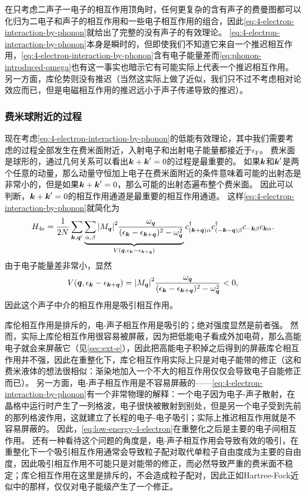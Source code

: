 在只考虑二声子一电子的相互作用顶角时，任何更复杂的含有声子的费曼图都可以化归为二电子和声子的相互作用和一些电子相互作用的组合，因此\eqref{eq:4-electron-interaction-by-phonon}就给出了完整的没有声子的有效理论。
\eqref{eq:4-electron-interaction-by-phonon}本身是瞬时的，但即使我们不知道它来自一个推迟相互作用，\eqref{eq:4-electron-interaction-by-phonon}含有电子能量差而\eqref{eq:phonon-introduced-omega}也有这一事实也暗示它有可能实际上代表一个推迟相互作用。
另一方面，库伦势则没有推迟（当然这实际上做了近似，我们只不过不考虑相对论效应而已，但是电磁相互作用的推迟远小于声子传递导致的推迟）。

\subsubsection{费米球附近的过程}

现在考虑\eqref{eq:4-electron-interaction-by-phonon}的低能有效理论，其中我们需要考虑的过程全部发生在费米面附近，入射电子和出射电子能量都接近于$\epsilon_\text{F}$。
费米面是球形的，通过几何关系可以看出$\vb*{k} + \vb*{k}' = 0$的过程是最重要的。
如果$\vb*{k}$和$\vb*{k}'$是两个任意的动量，那么动量守恒加上电子在费米面附近的条件意味着可能的出射态是非常小的，但是如果$\vb*{k} + \vb*{k}' = 0$，那么可能的出射态遍布整个费米面。
因此可以判断，$\vb*{k} + \vb*{k}' = 0$的相互作用通道是最重要的相互作用通道。
这样\eqref{eq:4-electron-interaction-by-phonon}就简化为
\begin{equation}
    {H}_{4\text{e}} = \frac{1}{2N} \sum_{\vb*{k}, \vb*{q}'} \underbrace{\sum_{\alpha, \beta} \abs{M_{\vb*{q}}}^2 \frac{\omega_{\vb*{q}}}{(\epsilon_{\vb*{k}} - \epsilon_{\vb*{k}+\vb*{q}})^2 - \omega_{\vb*{q}}^2}}_{V(\vb*{q}, \epsilon_{\vb*{k}} - \epsilon_{\vb*{k}+\vb*{q}})} {c}^\dagger_{(\vb*{k}+\vb*{q}) \alpha} {c}^\dagger_{(-\vb*{k}-\vb*{q}) \beta} {c}_{-\vb*{k} \beta} {c}_{\vb*{k} \alpha}.
    \label{eq:low-energy-4-electron}
\end{equation}
由于电子能量差非常小，显然
\[
    V(\vb*{q}, \epsilon_{\vb*{k}} - \epsilon_{\vb*{k}+\vb*{q}}) = \abs{M_{\vb*{q}}}^2 \frac{\omega_{\vb*{q}}}{(\epsilon_{\vb*{k}} - \epsilon_{\vb*{k}+\vb*{q}})^2 - \omega_{\vb*{q}}^2} < 0,
\]
因此这个声子中介的相互作用是吸引相互作用。

库伦相互作用是排斥的，电-声子相互作用是吸引的；绝对强度显然是前者强。
然而，实际上库伦相互作用很容易被屏蔽，因为把低能电子看成外加电荷，那么高能电子就会来屏蔽它（见\autoref{sec:ext-e}），因此把高能电子积掉之后得到的屏蔽库仑相互作用并不强，因此在重整化下，库仑相互作用实际上只是对电子能带的修正（这和费米液体的想法很相似：渐染地加入一个不大的相互作用仅仅会导致电子自能修正而已）。
另一方面，电-声子相互作用是不容易屏蔽的——\eqref{eq:4-electron-interaction-by-phonon}有一个非常物理的解释：一个电子因为电子-声子散射，在晶格中运行时产生了一列格波，电子很快被散射到别处，但是另一个电子受到先前的那列格波作用，这就建立了长程的电子-电子吸引；实际上推迟相互作用就是不容易屏蔽的。
因此，\eqref{eq:low-energy-4-electron}在重整化之后是主要的电子间相互作用。
还有一种看待这个问题的角度是，电-声子相互作用会导致有效的吸引，在重整化下一个吸引相互作用通常会导致粒子配对取代单粒子自由度成为主要的自由度，因此吸引相互作用不可能只是对能带的修正，而必然导致严重的费米面不稳定；库仑相互作用在这里是排斥的，不会造成粒子配对，因此正如Hartree-Fock近似中的那样，仅仅对电子能级产生了一个修正。

